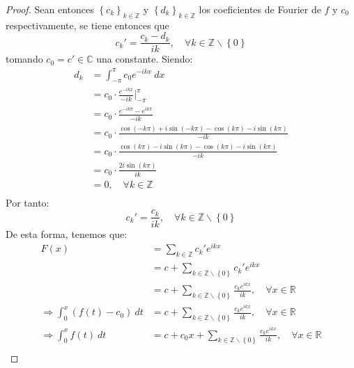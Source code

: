 \documentclass[12pt]{report}
\newcounter{it}
\theoremstyle{largebreak}
\begin{document}
\begin{proof}
        Sean entonces $\left\{c_k \right\}_{ k\in\mathbb{Z}}$ y $\left\{d_k \right\}_{ k\in\mathbb{Z}}$ los coeficientes de Fourier de $f$ y $c_0$ respectivamente, se tiene entonces que
        \begin{equation*}
            c_k'=\frac{c_k-d_k}{ik},\quad\forall k\in\mathbb{Z}\backslash\left\{0\right\}
        \end{equation*}
        tomando $c_0=c'\in\mathbb{C}$ una constante. Siendo:
        \begin{equation*}
            \begin{split}
                d_k&=\int_{-\pi}^\pi c_0e^{ -ikx}\:dx\\
                &=c_0\cdot\frac{e^{ -ikx}}{-ik}\Big|_{-\pi}^\pi\\
                &=c_0\cdot\frac{e^{ -ik\pi}-e^{ik\pi}}{-ik}\\
                &=c_0\cdot\frac{\cos(-k\pi)+i\sin(-k\pi)-\cos(k\pi)-i\sin(k\pi)}{-ik}\\
                &=c_0\cdot\frac{\cos(k\pi)-i\sin(k\pi)-\cos(k\pi)-i\sin(k\pi)}{-ik}\\
                &=c_0\cdot\frac{2i\sin(k\pi)}{ik}\\
                &=0,\quad\forall k\in\mathbb{Z} \\
            \end{split}
        \end{equation*}
        Por tanto:
        \begin{equation*}
            c_k'=\frac{c_k}{ik},\quad\forall k\in\mathbb{Z}\backslash\left\{0\right\}
        \end{equation*}
        De esta forma, tenemos que:
        \begin{equation*}
            \begin{split}
                F(x)&=\sum_{ k\in\mathbb{Z}}c_k'e^{ ikx}\\
                &=c+\sum_{k\in\mathbb{Z}\backslash\left\{0\right\}}c_k'e^{ ikx}\\
                &=c+\sum_{k\in\mathbb{Z}\backslash\left\{0\right\}}\frac{c_ke^{ ikx}}{ik},\quad\forall x\in\mathbb{R} \\
                \Rightarrow \int_{0}^{x}(f(t)-c_0)\:dt&=c+\sum_{k\in\mathbb{Z}\backslash\left\{0\right\}}\frac{c_ke^{ ikx}}{ik},\quad\forall x\in\mathbb{R} \\
                \Rightarrow \int_{0}^{x}f(t)\:dt&=c+c_0x+\sum_{k\in\mathbb{Z}\backslash\left\{0\right\}}\frac{c_ke^{ ikx}}{ik},\quad\forall x\in\mathbb{R} \\

\end{split}
\end{equation*}
\end{proof}
\end{document}
